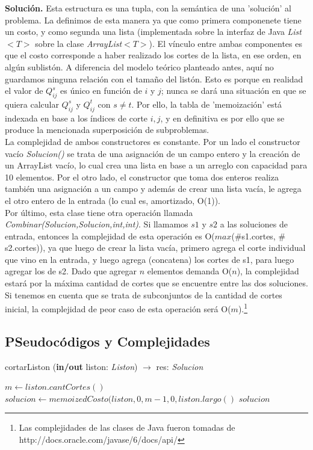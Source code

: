 \textbf{Solución.} Esta estructura es una tupla, con la semántica de una 'solución' al problema. La definimos de esta manera ya que como primera componenete tiene un costo, y como segunda una lista (implementada sobre la interfaz de Java \textsl{List$<T>$} sobre la clase \textsl{ArrayList$<T>$}). El vínculo entre ambas componentes es que el costo corresponde a haber realizado los cortes de la lista, en ese orden, en algún sublistón. A diferencia del modelo teórico planteado antes, aquí no guardamos ninguna relación con el tamaño del listón. Esto es porque en realidad el valor de $Q^{s}_{ij}$ es único en función de $i$ y $j$; nunca se dará una situación en que se quiera calcular $Q^{s}_{ij}$ y $Q^{t}_{ij}$ con $ s \neq t$. Por ello, la tabla de 'memoización' está indexada en base a los índices de corte $i,j$, y en definitiva es por ello que se produce la mencionada superposición de subproblemas.\\
\indent La complejidad de ambos constructores es constante. Por un lado el constructor vacío \textit{Solucion()} se trata de una asignación de un campo entero y la creación de un ArrayList vacío, lo cual crea una lista en base a un arreglo con capacidad para 10 elementos. Por el otro lado, el constructor que toma dos enteros realiza también una asignación a un campo y además de crear una lista vacía, le agrega el otro entero de la entrada (lo cual es, amortizado, O(1)).\\
\indent Por último, esta clase tiene otra operación llamada \textit{Combinar(Solucion,Solucion,int,int)}. Si llamamos $s1$ y $s2$ a las soluciones de entrada, entonces la complejidad de esta operación es O($max$($\#$s1.cortes, $\#$s2.cortes)), ya que luego de crear la lista vacía, primero agrega el corte individual que vino en la entrada, y luego agrega (concatena) los cortes de s1, para luego agregar los de s2. Dado que agregar $n$ elementos demanda O($n$), la complejidad estará por la máxima cantidad de cortes que se encuentre entre las dos soluciones. Si tenemos en cuenta que se trata de subconjuntos de la cantidad de cortes inicial, la complejidad de peor caso de esta operación será O($m$).\footnote{Las complejidades de las clases de Java fueron tomadas de http://docs.oracle.com/javase/6/docs/api/}

\subsection{PSeudocódigos y Complejidades}

\begin{algorithm}
\caption{cortarListon (\textbf{in/out} liston: \textsl{Liston}) $\rightarrow$ res: \textsl{Solucion}}
\begin{algorithmic}[1]

\STATE $ m \leftarrow liston.cantCortes()$
\STATE $ solucion \leftarrow memoizedCosto(liston,0,m-1,0,liston.largo()$
\RETURN $solucion$

\end{algorithmic}
\end{algorithm}

